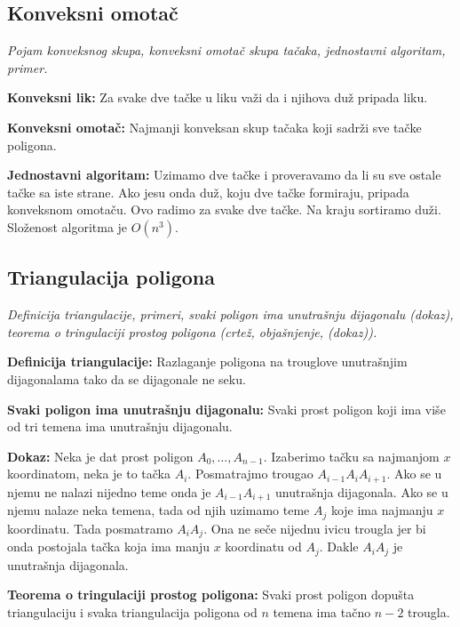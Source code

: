 \documentclass[12pt]{article}
\begin{document}
\subsection{Konveksni omotač}
\textit{Pojam konveksnog skupa, konveksni omotač skupa tačaka, jednostavni
    algoritam, primer.}
\par
\vspace*{1cm}

\textbf{Konveksni lik:} Za svake dve tačke u liku važi da i njihova duž pripada
liku.
\par

\textbf{Konveksni omotač:} Najmanji konveksan skup tačaka koji sadrži sve
tačke poligona.
\par

\textbf{Jednostavni algoritam:} Uzimamo dve tačke i proveravamo da li su sve
ostale tačke sa iste strane. Ako jesu onda duž, koju dve tačke formiraju,
pripada konveksnom omotaču. Ovo radimo za svake dve tačke. Na kraju sortiramo
duži. Složenost algoritma je $O(n^3)$.

\subsection{Triangulacija poligona}
\textit{Definicija triangulacije, primeri, svaki poligon ima unutrašnju
    dijagonalu (dokaz), teorema o tringulaciji prostog poligona (crtež,
    objašnjenje, (dokaz)).}
\par
\vspace*{1cm}

\textbf{Definicija triangulacije:} Razlaganje poligona na trouglove
unutrašnjim dijagonalama tako da se dijagonale ne seku.
\par

\textbf{Svaki poligon ima unutrašnju dijagonalu:} Svaki prost poligon koji ima
više od tri temena ima unutrašnju dijagonalu.
\par
\textbf{Dokaz:} Neka je dat prost poligon $A_0,\dotsc,A_{n-1}$. Izaberimo tačku
sa najmanjom $x$ koordinatom, neka je to tačka $A_i$. Posmatrajmo trougao
$A_{i-1}A_iA_{i+1}$. Ako se u njemu ne nalazi nijedno teme onda je
$A_{i-1}A_{i+1}$ unutrašnja dijagonala. Ako se u njemu nalaze neka temena, tada
od njih uzimamo teme $A_j$ koje ima najmanju $x$ koordinatu. Tada posmatramo
$A_iA_j$. Ona ne seče nijednu ivicu trougla jer bi onda postojala tačka koja
ima manju $x$ koordinatu od $A_j$. Dakle $A_iA_j$ je unutrašnja dijagonala.

\textbf{Teorema o tringulaciji prostog poligona:} Svaki prost poligon dopušta
triangulaciju i svaka triangulacija poligona od $n$ temena ima tačno $n-2$
trougla.
\par
\end{document}
